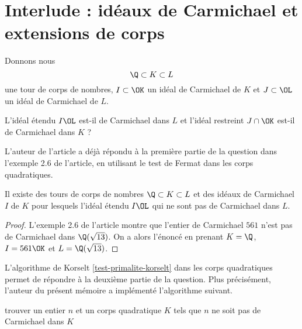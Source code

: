 \section{Interlude : idéaux de Carmichael et extensions de corps}

Donnons nous \[\Q\subset K \subset L\] une tour de corps de nombres, $I\subset \OK$ un idéal de Carmichael de $K$ et $J \subset \OL$ un idéal de Carmichael de $L$. 

\begin{question}
	L'idéal étendu $I\OL$ est-il de Carmichael dans $L$ et l'idéal restreint $J\cap\OK$ est-il de Carmichael dans $K$ ? 
\end{question}

L'auteur de l'article a déjà répondu à la première partie de la question dans l'exemple 2.6 de l'article, en utilisant le test de Fermat dans les corps quadratiques.

\begin{proposition}\label{premier-ce}
	Il existe des tours de corps de nombres $\Q\subset K \subset L$ et des idéaux de Carmichael $I$ de $K$ pour lesquels l'idéal étendu $I\OL$ qui ne sont pas de Carmichael dans $L$.
\end{proposition}

\begin{proof}
	L'exemple 2.6 de l'article montre que l'entier de Carmichael $561$ n'est pas de Carmichael dans $\Q(\sqrt{13})$. On a alors l'énoncé en prenant $K = \Q$, $I = 561\OK$ et $L = \Q(\sqrt{13})$.
\end{proof}

L'algorithme de Korselt \ref{test-primalite-korselt} dans les corps quadratiques permet de répondre à la deuxième partie de la question. Plus précisément, l'auteur du présent mémoire a implémenté l'algorithme suivant.

\vspace{1em}
\begin{algorithm}[H]\label{test-Fermat-quadratique}
\caption{trouver un entier $n$ et un corps quadratique $K$ tels que $n$ ne soit pas de Carmichael dans $K$}
\end{algorithm}
\vspace{1em}

